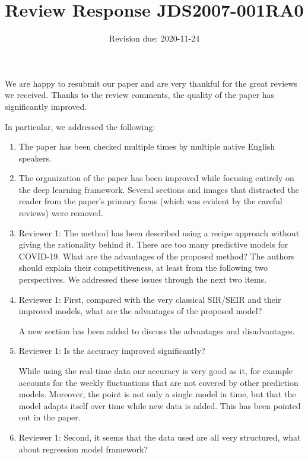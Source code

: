 \documentclass{article}
\title{Review Response JDS2007-001RA0}
\date{Revision due: 2020-11-24}
\begin{document}
\maketitle

\parindent 0pt We are happy to resubmit our paper and are very thankful for the great reviews we received. Thanks to the review comments, the quality of the paper has significantly improved. 

In particular, we addressed the following:

\begin{enumerate}

\item The paper has been checked multiple times by multiple native English speakers.

\item The organization of the paper has been improved while focusing entirely on the deep learning framework. Several sections and images that distracted the reader from the paper's primary focus (which was evident by the careful reviews) were removed.

\item Reviewer 1: The method has been described using a recipe approach without giving the rationality behind it. There are too many predictive models for COVID-19. What are the advantages of the proposed method? The authors should explain their competitiveness, at least from the following two perspectives. We addressed these issues through the next two items.

\item Reviewer 1: First, compared with the very classical SIR/SEIR and their improved models, what are the advantages of the proposed model? 

    A new section has been added to discuss the advantages and disadvantages.

\item Reviewer 1: Is the accuracy improved significantly? 

    While using the real-time data our accuracy is very good as it, for example accounts for the weekly fluctuations that are not covered by other prediction models. Moreover, the point is not only a single model in time, but that the model adapts itself over time while new data is added. This has been pointed out in the paper.

\item Reviewer 1: Second, it seems that the data used are all very structured, what about regression model framework? 


\end{enumerate}
\end{document}
